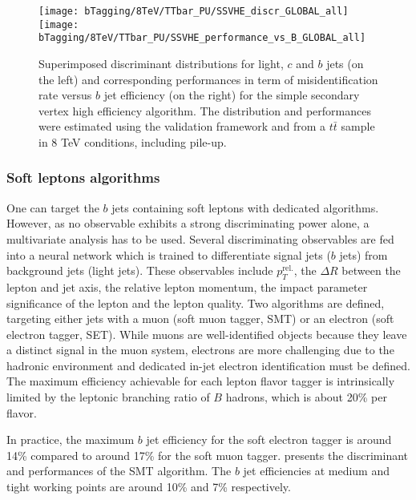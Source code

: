     \begin{figure}[th!]
        \centering
        \begin{minipage}{\textwidth}
        \texttt{[image: bTagging/8TeV/TTbar\_PU/SSVHE\_discr\_GLOBAL\_all]}
        \texttt{[image: bTagging/8TeV/TTbar\_PU/SSVHE\_performance\_vs\_B\_GLOBAL\_all]}
        \end{minipage}
        \caption{Superimposed discriminant distributions for light, $c$ and $b$ jets (on
        the left) and corresponding performances in term of misidentification rate versus $b$ jet efficiency
        (on the right) for the simple secondary vertex high efficiency algorithm.
        The distribution and performances were estimated using the validation framework and from
        a $t\bar{t}$ sample in 8 TeV conditions, including pile-up.}
        \label{fig:bTagging/perfSSV}
    \end{figure}

        \subsubsection{Soft leptons algorithms}

    One can target the $b$ jets containing soft leptons with dedicated algorithms. However,
    as no observable exhibits a strong discriminating power alone, a multivariate analysis
    has to be used. Several discriminating observables are fed into a neural network
    which is trained to differentiate signal jets ($b$ jets) from background jets (light jets).
    These observables include $p_T^\text{rel.}$, the $\Delta R$ between the lepton and
    jet axis, the relative lepton momentum, the impact parameter significance of the lepton
    and the lepton quality. Two algorithms are defined, targeting either jets with a
    muon (soft muon tagger, SMT) or an electron (soft electron tagger, SET). While muons are
    well-identified objects because they leave a distinct signal in the muon system,
    electrons are more challenging due to the hadronic environment and dedicated in-jet
    electron identification must be defined. The maximum efficiency achievable for each
    lepton flavor tagger is intrinsically limited by the leptonic branching ratio of $B$ hadrons,
    which is about 20\% per flavor.

    In practice, the maximum $b$ jet efficiency for the soft electron tagger is around
    14\% compared to around 17\% for the soft muon tagger.
     presents the discriminant and performances of the
    SMT algorithm. The $b$ jet efficiencies at medium and tight working points are around
    10\% and 7\% respectively.

